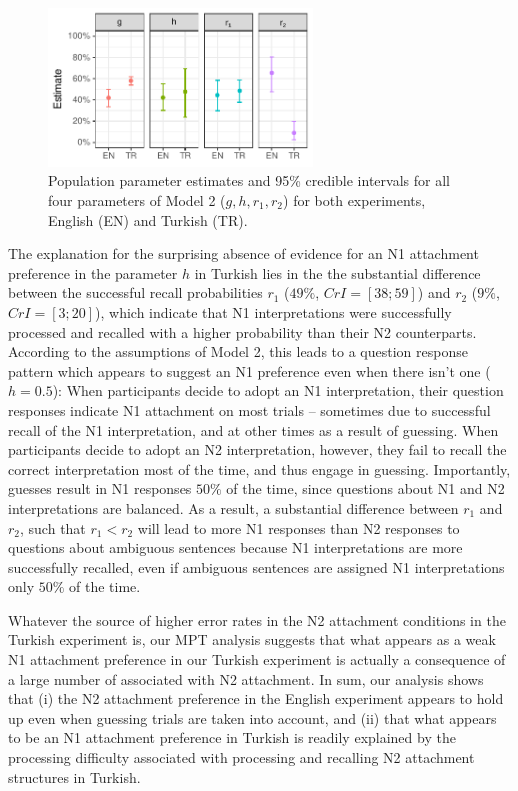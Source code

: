 \documentclass[11pt]{article}\usepackage[]{graphicx}\usepackage[]{color}
\begin{document}
\begin{figure}
\includegraphics[width=7cm]{./figures/estimates_r1r2hg.pdf}
\caption{Population parameter estimates and 95\% credible intervals for all four parameters of Model 2 ($g, h, r_1, r_2$) for both experiments, English (EN) and Turkish (TR). }
\label{estimates_r1r2hg}
\end{figure}

The explanation for the surprising absence of evidence for an N1 attachment preference in the parameter $h$ in Turkish lies in the the substantial difference between the successful recall probabilities $r_1$ ($49\%$, $CrI=[38; 59]$) and $r_2$ ($9\%$, $CrI=[3; 20]$), which indicate that N1 interpretations were successfully processed and recalled with a higher probability than their N2 counterparts.
According to the assumptions of Model 2, this leads to a question response pattern which appears to suggest an N1 preference even when there isn't one ($h=0.5$): When participants decide to adopt an N1 interpretation, their question responses indicate N1 attachment on most trials -- sometimes due to successful recall of the N1 interpretation, and at other times as a result of guessing. When participants decide to adopt an N2 interpretation, however, they fail to recall the correct interpretation most of the time, and thus engage in guessing. Importantly, guesses result in N1 responses $50\%$ of the time, since questions about N1 and N2 interpretations are balanced. As a result, a substantial difference between $r_1$ and $r_2$, such that $r_1 < r_2$ will lead to more N1 responses than N2 responses to questions about ambiguous sentences because N1 interpretations are more successfully recalled, even if ambiguous sentences are assigned N1 interpretations only $50\%$ of the time.

Whatever the source of higher error rates in the N2 attachment conditions in the Turkish experiment is, our MPT analysis suggests that what appears as a weak N1 attachment preference in our Turkish experiment is actually a consequence of a large number of  associated with N2 attachment.
In sum, our analysis shows that (i) the N2 attachment preference in the English experiment appears to hold up even when guessing trials are taken into account, and (ii) that what appears to be an N1 attachment preference in Turkish is readily explained by the processing difficulty associated with processing and recalling N2 attachment structures in Turkish.
\end{document}
